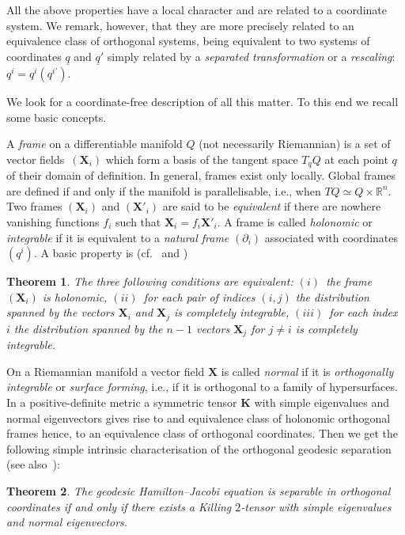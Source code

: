 \documentclass[10pt,a4paper]{amsart}
\def\bs{\boldsymbol}
\numberwithin{equation}{section}
\newtheorem{Theorem}{Theorem}[section]
 { \theoremstyle{definition}
\newtheorem{Notation}[Theorem]{Notation}
\newtheorem{Example}[Theorem]{Example}
\newtheorem{Remark}[Theorem]{Remark}
\newtheorem{Remarks}[Theorem]{Remarks}
 }
\begin{document}
All the above properties have a local character and are related to a coordinate system. We remark, however, that they are more precisely related to an equivalence class of orthogonal systems, being equivalent to two systems of coordinates $\underline q$ and $\underline q'$ simply related by a {\it separated transformation} or a {\it rescaling}: $q^i=q^i(q^{i'})$.

We look for a coordinate-free description of all this matter. To this end we recall some basic concepts.

A {\it frame} on a dif\/ferentiable manifold $Q$ (not necessarily Riemannian) is a set of vector f\/ields~$(\bs X_i)$ which form a basis of the tangent space $T_qQ$ at each point $q$ of their domain of def\/inition. In general, frames exist only locally. Global frames are def\/ined if and only if the manifold is parallelisable, i.e., when $TQ\simeq Q\times \mathbb R^n$. Two frames $(\bs X_i)$ and $(\bs X'_i)$ are said to be {\it equivalent} if there are nowhere vanishing functions $f_i$ such that $\bs X_i=f_i\bs X'_i$. A frame is called {\it holonomic} or {\it integrable} if it is equivalent to a {\it natural frame} $(\partial_i)$ associated with coordinates~$(q^i)$.
A basic property is  (cf.\ \cite{Schouten-1954} and \cite{BCR-2002a})

\begin{Theorem}\label{t:3.1}
The three following conditions are equivalent:
$(i)$~the frame $(\bs X_i)$ is holonomic, $(ii)$~for each pair of indices $(i,j)$ the distribution spanned by the vectors $\bs X_i$ and $\bs X_j$ is completely integrable, $(iii)$~for each index $i$ the distribution spanned by the $n-1$ vectors $\bs X_j$ for $j\neq i$ is completely integrable.
\end{Theorem}

On a Riemannian manifold a vector f\/ield $\bs X$ is called {\it normal} if it is {\it orthogonally integrable} or {\it surface forming}, i.e., if it is orthogonal to a family of hypersurfaces. In a positive-def\/inite metric a symmetric tensor $\bs K$ with simple eigenvalues and normal eigenvectors gives rise to and equivalence class of holonomic orthogonal frames hence, to an equivalence class of orthogonal coordinates. Then we get the following simple intrinsic characterisation of the orthogonal geodesic separation \cite[Corollary~4, Section~3]{KM-1980} (see also~\cite{Benenti-1993}):

\begin{Theorem} \label{t:3.2}
The geodesic Hamilton--Jacobi equation is separable in orthogonal coordinates if and only if there exists a Killing $2$-tensor with simple eigenvalues and normal eigenvectors.
\end{Theorem}
\end{document}
